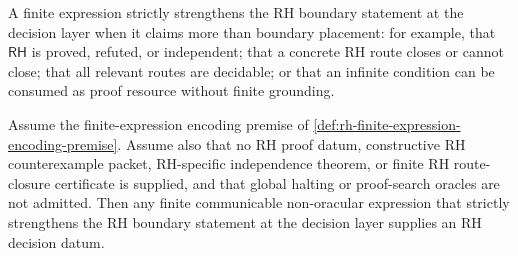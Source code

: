 \begin{definition}
\label{def:rh-strict-decision-strengthening}
A finite expression strictly strengthens the RH boundary statement at the
decision layer when it claims more than boundary placement: for example,
that $\mathsf{RH}$ is proved, refuted, or independent; that a concrete RH
route closes or cannot close; that all relevant routes are decidable; or
that an infinite condition can be consumed as proof resource without finite
grounding.
\end{definition}

\begin{theorem}
\label{thm:rh-finite-nonoracular-boundary-maximality}
Assume the finite-expression encoding premise of
\autoref{def:rh-finite-expression-encoding-premise}.  Assume also that no
RH proof datum, constructive RH counterexample packet, RH-specific
independence theorem, or finite RH route-closure certificate is supplied,
and that global halting or proof-search oracles are not admitted.  Then any
finite communicable non-oracular expression that strictly strengthens the
RH boundary statement at the decision layer supplies an RH decision datum.
\end{theorem}

